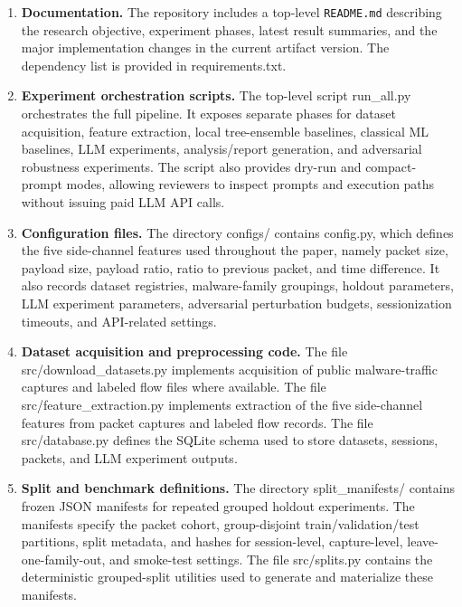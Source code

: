 \documentclass[conference]{IEEEtran}
\begin{document}
\begin{enumerate}
    \item \textbf{Documentation.}
    The repository includes a top-level \texttt{README.md} describing the research objective, experiment phases, latest result summaries, and the major implementation changes in the current artifact version. The dependency list is provided in requirements.txt.

    \item \textbf{Experiment orchestration scripts.}
    The top-level script run\_all.py orchestrates the full pipeline. It exposes separate phases for dataset acquisition, feature extraction, local tree-ensemble baselines, classical ML baselines, LLM experiments, analysis/report generation, and adversarial robustness experiments. The script also provides dry-run and compact-prompt modes, allowing reviewers to inspect prompts and execution paths without issuing paid LLM API calls.

    \item \textbf{Configuration files.}
    The directory configs/ contains config.py, which defines the five side-channel features used throughout the paper, namely packet size, payload size, payload ratio, ratio to previous packet, and time difference. It also records dataset registries, malware-family groupings, holdout parameters, LLM experiment parameters, adversarial perturbation budgets, sessionization timeouts, and API-related settings. 

    \item \textbf{Dataset acquisition and preprocessing code.}
    The file src/download\_datasets.py implements acquisition of public malware-traffic captures and labeled flow files where available. The file src/feature\_extraction.py implements extraction of the five side-channel features from packet captures and labeled flow records. The file src/database.py defines the SQLite schema used to store datasets, sessions, packets, and LLM experiment outputs. 

    \item \textbf{Split and benchmark definitions.}
    The directory split\_manifests/ contains frozen JSON manifests for repeated grouped holdout experiments. The manifests specify the packet cohort, group-disjoint train/validation/test partitions, split metadata, and hashes for session-level, capture-level, leave-one-family-out, and smoke-test settings. The file src/splits.py contains the deterministic grouped-split utilities used to generate and materialize these manifests. 


\end{enumerate}
\end{document}
